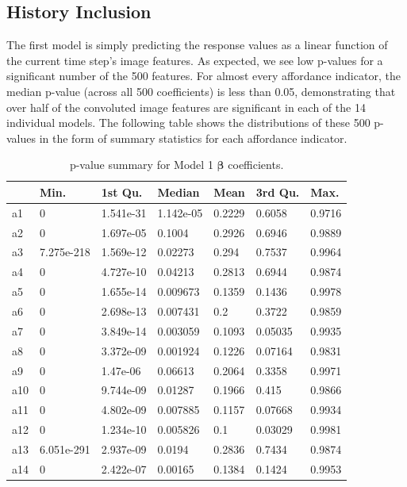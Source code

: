 \documentclass[11pt]{article}
\begin{document}
\subsection{History Inclusion}
The first model is simply predicting the response values as a linear function of the current time step's image features.  As expected, we see low p-values for a significant number of the 500 features.  For almost every affordance indicator, the median p-value (across all 500 coefficients) is less than 0.05, demonstrating that over half of the convoluted image features are significant in each of the 14 individual models.  The following table shows the distributions of these 500 p-values in the form of summary statistics for each affordance indicator.
\begin{table}[H]
\centering
\caption{p-value summary for Model 1  $\bm{\beta}$ coefficients.}
\begin{tabular}{@{}lllllll@{}}
\toprule
    & Min.       & 1st Qu.   & Median    & Mean   & 3rd Qu. & Max.   \\ \midrule
a1  & 0          & 1.541e-31 & 1.142e-05 & 0.2229 & 0.6058  & 0.9716 \\
a2  & 0          & 1.697e-05 & 0.1004    & 0.2926 & 0.6946  & 0.9889 \\
a3  & 7.275e-218 & 1.569e-12 & 0.02273   & 0.294  & 0.7537  & 0.9964 \\
a4  & 0          & 4.727e-10 & 0.04213   & 0.2813 & 0.6944  & 0.9874 \\
a5  & 0          & 1.655e-14 & 0.009673  & 0.1359 & 0.1436  & 0.9978 \\
a6  & 0          & 2.698e-13 & 0.007431  & 0.2    & 0.3722  & 0.9859 \\
a7  & 0          & 3.849e-14 & 0.003059  & 0.1093 & 0.05035 & 0.9935 \\
a8  & 0          & 3.372e-09 & 0.001924  & 0.1226 & 0.07164 & 0.9831 \\
a9  & 0          & 1.47e-06  & 0.06613   & 0.2064 & 0.3358  & 0.9971 \\
a10 & 0          & 9.744e-09 & 0.01287   & 0.1966 & 0.415   & 0.9866 \\
a11 & 0          & 4.802e-09 & 0.007885  & 0.1157 & 0.07668 & 0.9934 \\
a12 & 0          & 1.234e-10 & 0.005826  & 0.1    & 0.03029 & 0.9981 \\
a13 & 6.051e-291 & 2.937e-09 & 0.0194    & 0.2836 & 0.7434  & 0.9874 \\
a14 & 0          & 2.422e-07 & 0.00165   & 0.1384 & 0.1424  & 0.9953 \\ \bottomrule
\end{tabular}
\end{table}
\end{document}
